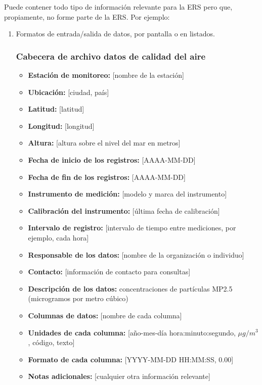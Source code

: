 \documentclass[
11pt, %
codirector, %
]{charter}
\begin{document}
Puede contener todo tipo de información relevante para la ERS pero
que, propiamente, no forme parte de la ERS. Por ejemplo:

\begin{enumerate}
\item Formatos de entrada/salida de datos, por pantalla o en listados.



	
	\subsubsection*{Cabecera de archivo datos de calidad del aire}
	
	\begin{itemize}
	\item \textbf{Estación de monitoreo:} [nombre de la estación]
	\item \textbf{Ubicación:} [ciudad, país]
	\item \textbf{Latitud:} [latitud]
	\item \textbf{Longitud:} [longitud]
	\item \textbf{Altura:} [altura sobre el nivel del mar en metros]
	\item \textbf{Fecha de inicio de los registros:} [AAAA-MM-DD]
	\item \textbf{Fecha de fin de los registros:} [AAAA-MM-DD]
	\item \textbf{Instrumento de medición:} [modelo y marca del instrumento]
	\item \textbf{Calibración del instrumento:} [última fecha de calibración]
	\item \textbf{Intervalo de registro:} [intervalo de tiempo entre mediciones, por ejemplo, cada hora]
	\item \textbf{Responsable de los datos:} [nombre de la organización o individuo]
	\item \textbf{Contacto:} [información de contacto para consultas]
	\item \textbf{Descripción de los datos:} concentraciones de partículas MP2.5 (microgramos por metro cúbico)
	\item \textbf{Columnas de datos:} [nombre de cada columna]
	\item \textbf{Unidades de cada columna:} [año-mes-día hora:minuto:segundo, $\mu g/m^3$, código, texto]
	\item \textbf{Formato de cada columna:} [YYYY-MM-DD HH:MM:SS, 0.00]
	\item \textbf{Notas adicionales:} [cualquier otra información relevante]
	\end{itemize}
	

\end{enumerate}
\end{document}
